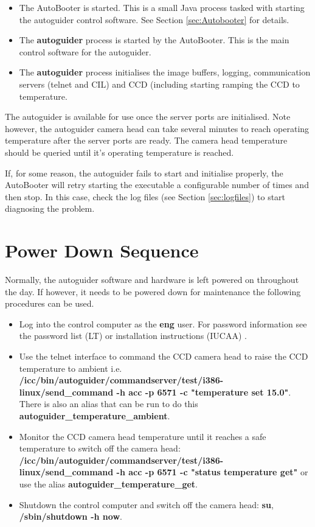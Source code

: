 \documentclass[10pt,a4paper]{article}
\begin{document}
\begin{itemize}
\item The AutoBooter is started. This is a small Java process tasked with starting the autoguider control software. See Section \ref{sec:Autobooter} for details.
\item The {\bf autoguider} process is started by the AutoBooter. This is the main control software for the autoguider.
\item The {\bf autoguider} process initialises the image buffers, logging, communication servers (telnet and CIL) and CCD (including starting ramping the CCD to temperature.
\end{itemize}

The autoguider is available for use once the server ports are initialised. Note however, the autoguider camera head can take several minutes to reach operating temperature after the server ports are ready. The camera head temperature should be queried until it's operating temperature is reached.

If, for some reason, the autoguider fails to start and initialise properly, the AutoBooter will retry starting the executable a configurable number of times and then stop. In this case, check the log files (see Section \ref{sec:logfiles}) to start diagnosing the problem.

\section{Power Down Sequence}

Normally, the autoguider software and hardware is left powered on throughout the day. If however, it needs to be powered down for maintenance the following procedures can be used.

\begin{itemize}
\item Log into the control computer as the {\bf eng} user. For password information see the password list (LT) or installation instructions (IUCAA) \cite{bib:iucaainstallation}.
\item Use the telnet interface to command the CCD camera head to raise the CCD temperature to ambient i.e. {\bf /icc/bin/autoguider/commandserver/test/i386-linux/send\_command -h acc -p 6571 -c "temperature set 15.0"}. There is also an alias that can be run to do this {\bf autoguider\_temperature\_ambient}.
\item Monitor the CCD camera head temperature until it reaches a safe temperature to switch off the camera head: {\bf /icc/bin/autoguider/commandserver/test/i386-linux/send\_command -h acc -p 6571 -c "status temperature get"} or use the alias {\bf autoguider\_temperature\_get}.
\item Shutdown the control computer and switch off the camera head: {\bf su}, {\bf /sbin/shutdown -h now}.
\end{itemize}
\end{document}
